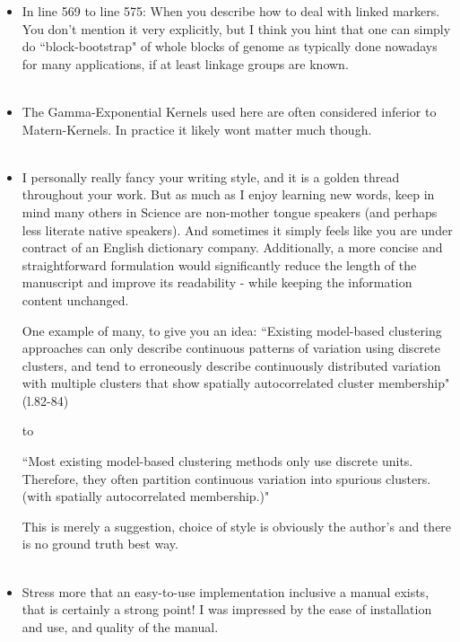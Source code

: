 \documentclass[11pt]{letter}
\newcommand{\gb}[1]{{\bf\color{black}{#1}}}
\begin{document}
\begin{itemize}
 \item In line 569 to line 575: When you describe how to deal with linked markers. 
 You don't mention it very explicitly, 
 but I think you hint that one can simply do ``block-bootstrap" of whole blocks of genome 
 as typically done nowadays for many applications, 
 if at least linkage groups are known.\\\\
\gb{RESPONSE.}
 
 \item The Gamma-Exponential Kernels used here are often considered inferior to Matern-Kernels. 
 In practice it likely wont matter much though.\\\\
\gb{RESPONSE.}

\item I personally really fancy your writing style, 
and it is a golden thread throughout your work.  
But as much as I enjoy learning new words, 
keep in mind many others in Science are non-mother tongue speakers 
(and perhaps less literate native speakers). 
And sometimes it simply feels like you are under contract of an English dictionary company.
Additionally, a more concise and straightforward formulation 
would significantly reduce the length of the manuscript and improve its readability 
- while keeping the information content unchanged. 

One example of many, to give you an idea:
``Existing model-based clustering approaches can only describe 
continuous patterns of variation using discrete clusters,
 and tend to erroneously describe continuously distributed variation 
 with multiple clusters that show spatially autocorrelated cluster membership" (l.82-84)

to

``Most existing model-based clustering methods only use discrete units. 
Therefore, they often partition continuous variation into spurious clusters. 
(with spatially autocorrelated membership.)"

This is merely a suggestion, choice of style is obviously the author's and there is
no ground truth best way.\\\\
\gb{RESPONSE.}

\item Stress more that an easy-to-use implementation inclusive a manual exists, that is
certainly a strong point! I was impressed by the ease of installation and use, and quality of the manual.\\\\
\gb{RESPONSE.}

\end{itemize}
\end{document}
